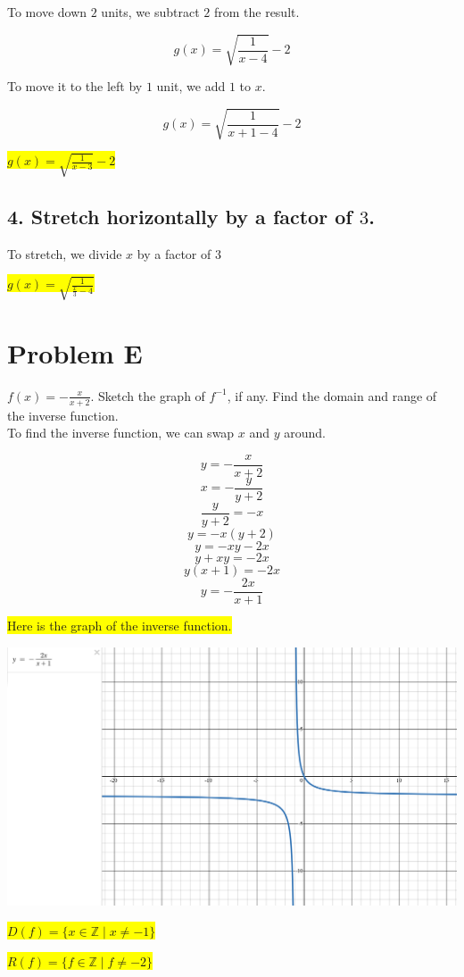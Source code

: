 \documentclass{article}
\begin{document}
To move down $2$ units, we subtract $2$ from the result.

\[
g(x) = \sqrt{\frac{1}{x-4}} - 2
\]

To move it to the left by $1$ unit, we add $1$ to $x$.

\[
g(x) = \sqrt{\frac{1}{x+1-4}} - 2
\]

\begin{center}
\colorbox{yellow}{$g(x) = \sqrt{\frac{1}{x-3}} - 2$}
\end{center}

\subsection*{4. Stretch horizontally by a factor of $3$.}

To stretch, we divide $x$ by a factor of $3$

\begin{center}
\colorbox{yellow}{$g(x) = \sqrt{\frac{1}{\frac{x}{3}-4}}$}
\end{center}

\section*{Problem E}
$f(x) = -\frac{x}{x+2}$. 
Sketch the graph of $f^{-1}$, if any. Find the domain and
range of the inverse function. \\

To find the inverse function, we can swap $x$ and $y$ around.

\[
y = -\frac{x}{x+2}
\]
\[
x = -\frac{y}{y+2}
\]
\[
\frac{y}{y+2} = -x
\]
\[
y = -x(y + 2)
\]
\[
y = -xy - 2x
\]
\[
y + xy = -2x
\]
\[
y(x + 1) = -2x
\]
\[
y = -\frac{2x}{x+1}
\]

\colorbox{yellow}{Here is the graph of the inverse function.}

\begin{center}
    \includegraphics[width=0.8\linewidth]{graph2.png}
\end{center}

\begin{center}
\colorbox{yellow}{$D(f) = \{ x \in \mathbb{Z} \mid x \neq -1 \}$}
\end{center}

\begin{center}
\colorbox{yellow}{$R(f) = \{ f \in \mathbb{Z} \mid f \neq -2 \}$}
\end{center}
\end{document}
